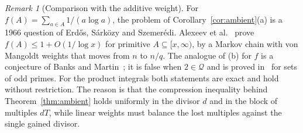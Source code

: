 \documentclass[11pt]{article}
\theoremstyle{remark}
\newtheorem{remark}[theorem]{Remark}
\begin{document}
\begin{remark}[Comparison with the additive weight]\label{rem:additive}
For $f(A)=\sum_{a\in A}1/(a\log a)$, the problem of
Corollary~\ref{cor:ambient}(a) is a 1966 question of Erd\H{o}s,
S\'ark\"ozy and Szemer\'edi. Alexeev et al.~\cite{Alexeev2026} prove
$f(A)\le1+O(1/\log x)$ for primitive $A\subseteq[x,\infty)$, by a Markov
chain with von Mangoldt weights that moves from $n$ to $n/q$. The
analogue of (b) for $f$ is a conjecture of Banks and
Martin~\cite{BanksMartin2013}; it is false when $2\in\mathcal Q$ and is
proved in~\cite{Alexeev2026} for sets of odd primes. For the product
integrals both statements are exact and hold without restriction. The
reason is that the compression inequality behind
Theorem~\ref{thm:ambient} holds uniformly in the divisor $d$ and in the
block of multiples $dT$, while linear weights must balance the lost
multiples against the single gained divisor.
\end{remark}
\end{document}
